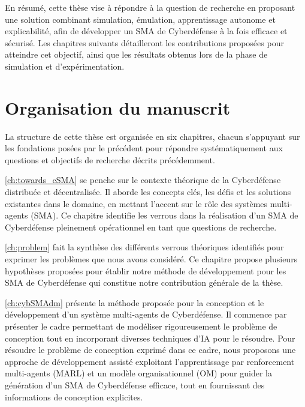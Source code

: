 En résumé, cette thèse vise à répondre à la question de recherche en proposant une solution combinant simulation, émulation, apprentissage autonome et explicabilité, afin de développer un SMA de Cyberdéfense à la fois efficace et sécurisé. Les chapitres suivants détailleront les contributions proposées pour atteindre cet objectif, ainsi que les résultats obtenus lors de la phase de simulation et d'expérimentation.


\section{Organisation du manuscrit}

La structure de cette thèse est organisée en six chapitres, chacun s'appuyant sur les fondations posées par le précédent pour répondre systématiquement aux questions et objectifs de recherche décrits précédemment.


\autoref{ch:towards_cSMA} se penche sur le contexte théorique de la Cyberdéfense distribuée et décentralisée. Il aborde les concepts clés, les défis et les solutions existantes dans le domaine, en mettant l'accent sur le rôle des systèmes multi-agents (SMA). Ce chapitre identifie les verrous dans la réalisation d'un SMA de Cyberdéfense pleinement opérationnel en tant que questions de recherche. 

\autoref{ch:problem} fait la synthèse des différents verrous théoriques identifiés pour exprimer les problèmes que nous avons considéré. Ce chapitre propose plusieurs hypothèses proposées pour établir notre méthode de développement pour les SMA de Cyberdéfense qui constitue notre contribution générale de la thèse.

\autoref{ch:cybSMAdm} présente la méthode proposée pour la conception et le développement d'un système multi-agents de Cyberdéfense. Il commence par présenter le cadre permettant de modéliser rigoureusement le problème de conception tout en incorporant diverses techniques d'IA pour le résoudre. Pour résoudre le problème de conception exprimé dans ce cadre, nous proposons une approche de développement assisté exploitant l'apprentissage par renforcement multi-agents (MARL) et un modèle organisationnel (OM) pour guider la génération d'un SMA de Cyberdéfense efficace, tout en fournissant des informations de conception explicites.

